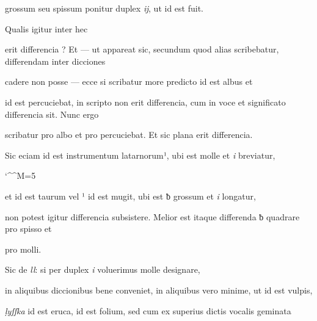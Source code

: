 \splitlines

grossum seu spissum ponitur duplex \textit{ĳ}, ut  id est fuit.

Qualis igitur inter hec

\fulllines
erit differencia ? Et — ut appareat sic, secundum quod alias scribebatur, differendam inter dicciones 

cadere non posse — ecce si scribatur more predicto  id est albus et 

id est percuciebat, in scripto non erit differencia, cum in voce et significato differencia sit. Nunc ergo

scribatur  pro albo et  pro percuciebat. Et sic plana erit differencia.

Sic eciam  id est instrumentum latarnorum¹, ubi est   molle et \textit{i} breviatur, 


\catcode `\^^M=5


\obeylines

et  id est taurum vel ¹ id est mugit, ubi est ƀ grossum et \textit{i} longatur,

non potest igitur differencia subsistere. Melior est itaque differenda ƀ quadrare pro spisso et 

\splitlines
{} pro molli.

\indentK Sic de \textit{ll}: si per duplex \textit{i} voluerimus  molle designare,

\fulllines
in aliquibus diccionibus bene conveniet, in aliquibus vero minime, ut  id est vulpis, 

\textit{ḷyſſka} id est eruca,  id est folium, sed cum ex superius dictis vocalis geminata

